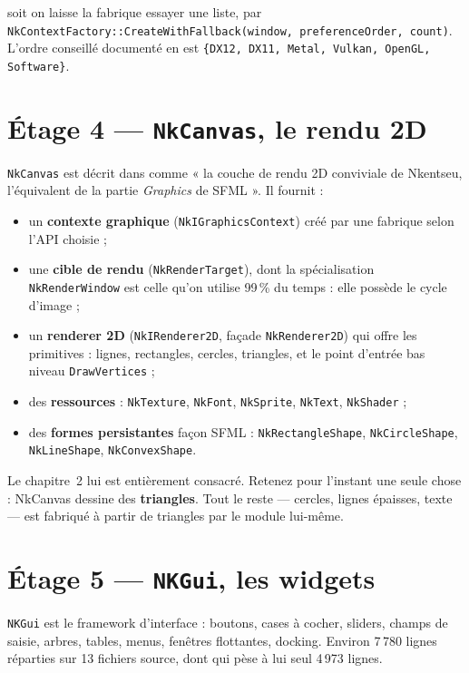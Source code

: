 \noindent soit on laisse la fabrique essayer une liste, par
\texttt{NkContextFactory::CreateWithFallback(window, preferenceOrder, count)}.
L'ordre conseillé documenté en  est
\texttt{\{DX12, DX11, Metal, Vulkan, OpenGL, Software\}}.

\section{Étage 4 — \texttt{NkCanvas}, le rendu 2D}

\texttt{NkCanvas} est décrit dans  comme
« la couche de rendu 2D conviviale de Nkentseu, l'équivalent de la partie
\emph{Graphics} de SFML ». Il fournit :

\begin{itemize}
  \item un \textbf{contexte graphique} (\texttt{NkIGraphicsContext}) créé par une
        fabrique selon l'API choisie ;
  \item une \textbf{cible de rendu} (\texttt{NkRenderTarget}), dont la
        spécialisation \texttt{NkRenderWindow} est celle qu'on utilise
        99\,\% du temps : elle possède le cycle d'image ;
  \item un \textbf{renderer 2D} (\texttt{NkIRenderer2D}, façade
        \texttt{NkRenderer2D}) qui offre les primitives : lignes, rectangles,
        cercles, triangles, et le point d'entrée bas niveau
        \texttt{DrawVertices} ;
  \item des \textbf{ressources} : \texttt{NkTexture}, \texttt{NkFont},
        \texttt{NkSprite}, \texttt{NkText}, \texttt{NkShader} ;
  \item des \textbf{formes persistantes} façon SFML : \texttt{NkRectangleShape},
        \texttt{NkCircleShape}, \texttt{NkLineShape}, \texttt{NkConvexShape}.
\end{itemize}

Le chapitre~2 lui est entièrement consacré. Retenez pour l'instant une seule
chose : NkCanvas dessine des \textbf{triangles}. Tout le reste — cercles,
lignes épaisses, texte — est fabriqué à partir de triangles par le module
lui-même.

\section{Étage 5 — \texttt{NKGui}, les widgets}

\texttt{NKGui} est le framework d'interface : boutons, cases à cocher, sliders,
champs de saisie, arbres, tables, menus, fenêtres flottantes, docking. Environ
7\,780 lignes réparties sur 13 fichiers source, dont
 qui pèse à lui
seul 4\,973 lignes.

